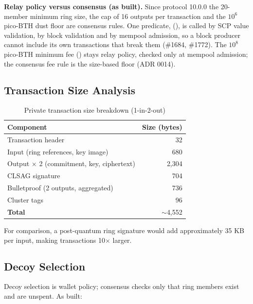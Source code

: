 \textbf{Relay policy versus consensus (as built).} Since protocol 10.0.0
the 20-member minimum ring size, the cap of 16 outputs per transaction and
the $10^{6}$ pico-BTH dust floor are consensus rules. One predicate,
 (), is
called by SCP value validation, by block validation and by mempool
admission, so a block producer cannot include its own transactions that
break them (\#1684, \#1772). The $10^{8}$ pico-BTH minimum fee
() stays relay policy, checked only at mempool admission;
the consensus fee rule is the size-based floor (ADR 0014).

\subsection{Transaction Size Analysis}

\begin{table}[h]
\centering
\caption{Private transaction size breakdown (1-in-2-out)}
\label{tab:tx-size}
\begin{tabular}{@{}lr@{}}
\toprule
\textbf{Component} & \textbf{Size (bytes)} \\
\midrule
Transaction header & 32 \\
Input (ring references, key image) & 680 \\
Output $\times$ 2 (commitment, key, ciphertext) & 2,304 \\
CLSAG signature & 704 \\
Bulletproof (2 outputs, aggregated) & 736 \\
Cluster tags & 96 \\
\midrule
\textbf{Total} & $\sim$4,552 \\
\bottomrule
\end{tabular}
\end{table}

For comparison, a post-quantum ring signature would add approximately
35 KB per input, making transactions 10$\times$ larger.

\subsection{Decoy Selection}

Decoy selection is wallet policy; consensus checks only that ring members
exist and are unspent. As built:

